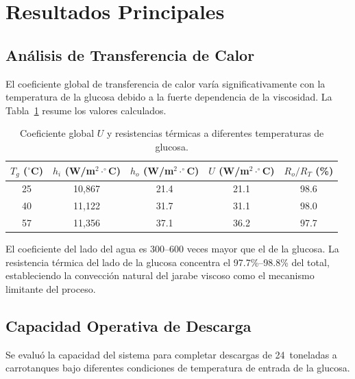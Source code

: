\documentclass[11pt,a4paper]{article}
\begin{document}
\section{Resultados Principales}

\subsection{Análisis de Transferencia de Calor}

El coeficiente global de transferencia de calor varía significativamente con la temperatura de la glucosa debido a la fuerte dependencia de la viscosidad. La Tabla~\ref{tab:U_vs_T} resume los valores calculados.

\begin{table}[H]
\centering
\footnotesize
\caption{Coeficiente global $U$ y resistencias térmicas a diferentes temperaturas de glucosa.}
\label{tab:U_vs_T}
\begin{tabular}{@{}ccccc@{}}
\toprule
\textbf{$T_g$ ($^\circ$C)} & \textbf{$h_i$ (W/m$^2\cdot^\circ$C)} & \textbf{$h_o$ (W/m$^2\cdot^\circ$C)} & \textbf{$U$ (W/m$^2\cdot^\circ$C)} & \textbf{$R_o/R_T$ (\%)} \\
\midrule
25 & 10,867 & 21.4 & 21.1 & 98.6 \\
40 & 11,122 & 31.7 & 31.1 & 98.0 \\
57 & 11,356 & 37.1 & 36.2 & 97.7 \\
\bottomrule
\end{tabular}
\end{table}

El coeficiente del lado del agua es 300--600 veces mayor que el de la glucosa. La resistencia térmica del lado de la glucosa concentra el 97.7\%--98.8\% del total, estableciendo la convección natural del jarabe viscoso como el mecanismo limitante del proceso.

\subsection{Capacidad Operativa de Descarga}

Se evaluó la capacidad del sistema para completar descargas de 24~toneladas a carrotanques bajo diferentes condiciones de temperatura de entrada de la glucosa.
\end{document}
